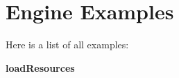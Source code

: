 \section{Engine Examples}
Here is a list of all examples:\begin{CompactItemize}
\item 
{\bf loadResources}
\end{CompactItemize}

